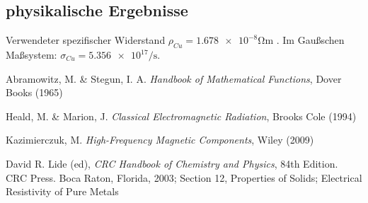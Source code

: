 \documentclass[10pt,a4paper]{article}
\begin{document}
\subsection{physikalische Ergebnisse}
Verwendeter spezifischer Widerstand $\rho_{Cu} = \num{1.678e-8} \si{\ohm\metre}$ \cite{crchandbook}.
Im Gaußschen Maßsystem: $\sigma_{Cu} = \num{5.356e17} \si{\per\second}$.


\begin{thebibliography}{9}

Abramowitz, M. \& Stegun, I. A.
\emph{Handbook of Mathematical Functions},
Dover Books (1965)

Heald, M. \& Marion, J.
\emph{Classical Electromagnetic Radiation},
Brooks Cole (1994)

Kazimierczuk, M.
\emph{High-Frequency Magnetic Components},
Wiley (2009)

David R. Lide (ed),
\emph{CRC Handbook of Chemistry and Physics},
84th Edition. CRC Press. Boca Raton, Florida, 2003;
Section 12, Properties of Solids; Electrical Resistivity of Pure Metals

\end{thebibliography}
\end{document}
